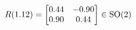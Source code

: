 \documentclass[preview]{standalone}
\begin{document}
\begin{align*}
\special{dvisvgm:raw <g id='unique000'>}R(1.12) = \begin{bmatrix} 0.44 & -0.90 \\ 0.90 & 0.44 \end{bmatrix} \in \text{SO}(2)\special{dvisvgm:raw </g>}
\end{align*}
\end{document}
